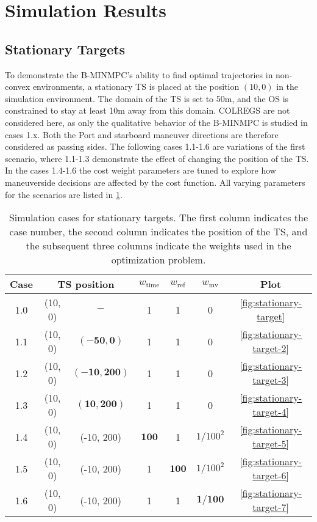 \section{Simulation Results}\label{sec:simulation-results}

\subsection{Stationary Targets}
\label{sec:case-1-stationary-targets}

To demonstrate the B-MINMPC's ability to find optimal trajectories in non-convex environments, a stationary TS is placed at the position $(10, 0)$ in the simulation environment. The domain of the TS is set to 50m, and the OS is constrained to stay at least 10m away from this domain. COLREGS are not considered here, as only the qualitative behavior of the B-MINMPC is studied in cases 1.x. Both the Port and starboard maneuver directions are therefore considered as passing sides. The following cases 1.1-1.6 are variations of the first scenario, where 1.1-1.3 demonstrate the effect of changing the position of the TS. In the cases 1.4-1.6 the cost weight parameters are tuned to explore how maneuverside decisions are affected by the cost function. 
All varying parameters for the scenarios are listed in \cref{tab:stationary-targets}.


\begin{table}
    \centering
    \caption{Simulation cases for stationary targets. The first column indicates the case number, the second column indicates the position of the TS, and the subsequent three columns indicate the weights used in the optimization problem.}
    \label{tab:stationary-targets}
    \begin{tabular}{|c|c|c|c|c|c|c|}
        \hline
        Case & \multicolumn{2}{c|}{TS position} & $w_\text{time}$ & $w_\text{ref}$ & $w_\text{mv}$ & Plot \\
        \hline
        1.0 & (10, 0) & $-$ & 1 & 1 & 0 & \cref{fig:stationary-target} \\
        \hline
        1.1 & (10, 0) & $\mathbf{(-50, 0)}$ & 1 & 1 & 0 & \cref{fig:stationary-target-2} \\
        \hline
        1.2 & (10, 0) & $\mathbf{(-10, 200)}$ & 1 & 1 & 0 & \cref{fig:stationary-target-3} \\
        \hline
        1.3 & (10, 0) & $\mathbf{(10, 200)}$ & 1 & 1 & 0 & \cref{fig:stationary-target-4} \\
        \hline
        1.4 & (10, 0) & (-10, 200) & $\mathbf{100}$ & 1 & $1/100^2$ & \cref{fig:stationary-target-5} \\
        \hline
        1.5 & (10, 0) & (-10, 200) & 1 & $\mathbf{100}$ & $1/100^2$ & \cref{fig:stationary-target-6} \\
        \hline
        1.6 & (10, 0) & (-10, 200) & 1 & 1 & $\mathbf{1/100}$ & \cref{fig:stationary-target-7} \\
        \hline
    \end{tabular}
\end{table}


